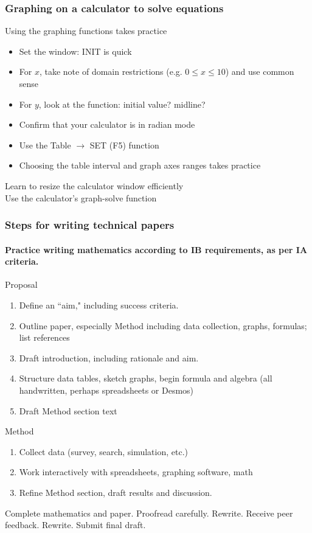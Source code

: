 \documentclass{beamer}
\begin{document}
\frame
{
  \frametitle{Graphing on a calculator to solve equations}

\begin{block}{Using the graphing functions takes practice}
  \begin{itemize}
    \item Set the window: INIT is quick
    \item For $x$, take note of domain restrictions (e.g. $0 \leq x \leq 10$) and use common sense
    \item For $y$, look at the function: initial value? midline? 
    \item Confirm that your calculator is in radian mode
    \item Use the Table $\xrightarrow{}$ SET (F5) function
    \item Choosing the table interval and graph axes ranges takes practice
  \end{itemize}
\end{block}
  Learn to resize the calculator window efficiently\\
  Use the calculator's graph-solve function
}


\frame
{
  \frametitle{Steps for writing technical papers}
  \framesubtitle{Practice writing mathematics according to IB requirements, as per IA criteria.}
Proposal
\begin{enumerate}
    \item Define an ``aim," including success criteria. 
    \item Outline paper, especially Method including data collection, graphs, formulas; list references
    \item Draft introduction, including rationale and aim.
    \item Structure data tables, sketch graphs, begin formula and algebra (all handwritten, perhaps spreadsheets or Desmos)
    \item Draft Method section text
\end{enumerate}
Method
\begin{enumerate}
    \item Collect data (survey, search, simulation, etc.)
    \item Work interactively with spreadsheets, graphing software, math
    \item Refine Method section, draft results and discussion.
\end{enumerate}
Complete mathematics and paper. Proofread carefully. Rewrite. Receive peer feedback. Rewrite. Submit final draft.
}
\end{document}
